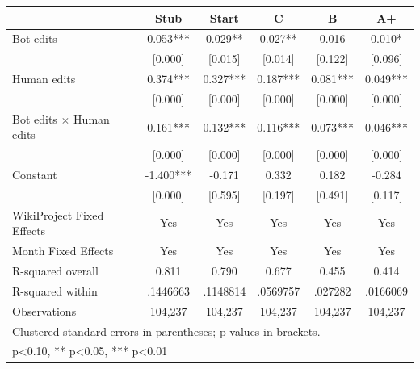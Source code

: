{
\def\sym#1{\ifmmode^{#1}\else\(^{#1}\)\fi}
\begin{tabular}{l*{5}{c}}
\toprule
                    &\multicolumn{1}{c}{Stub}&\multicolumn{1}{c}{Start}&\multicolumn{1}{c}{C}&\multicolumn{1}{c}{B}&\multicolumn{1}{c}{A+}\\
\midrule
Bot edits           &     0.053***&     0.029** &     0.027** &     0.016   &     0.010*  \\
                    &   [0.000]   &   [0.015]   &   [0.014]   &   [0.122]   &   [0.096]   \\
Human edits         &     0.374***&     0.327***&     0.187***&     0.081***&     0.049***\\
                    &   [0.000]   &   [0.000]   &   [0.000]   &   [0.000]   &   [0.000]   \\
Bot edits $\times$ Human edits&     0.161***&     0.132***&     0.116***&     0.073***&     0.046***\\
                    &   [0.000]   &   [0.000]   &   [0.000]   &   [0.000]   &   [0.000]   \\
Constant            &    -1.400***&    -0.171   &     0.332   &     0.182   &    -0.284   \\
                    &   [0.000]   &   [0.595]   &   [0.197]   &   [0.491]   &   [0.117]   \\
WikiProject Fixed Effects&       Yes   &       Yes   &       Yes   &       Yes   &       Yes   \\
Month Fixed Effects &       Yes   &       Yes   &       Yes   &       Yes   &       Yes   \\
\midrule
R-squared overall   &     0.811   &     0.790   &     0.677   &     0.455   &     0.414   \\
R-squared within    &  .1446663   &  .1148814   &  .0569757   &   .027282   &  .0166069   \\
Observations        &   104,237   &   104,237   &   104,237   &   104,237   &   104,237   \\
\bottomrule
\multicolumn{6}{l}{\footnotesize Clustered standard errors in parentheses; p-values in brackets.}\\
\multicolumn{6}{l}{\footnotesize * p<0.10, ** p<0.05, *** p<0.01}\\
\end{tabular}
}
